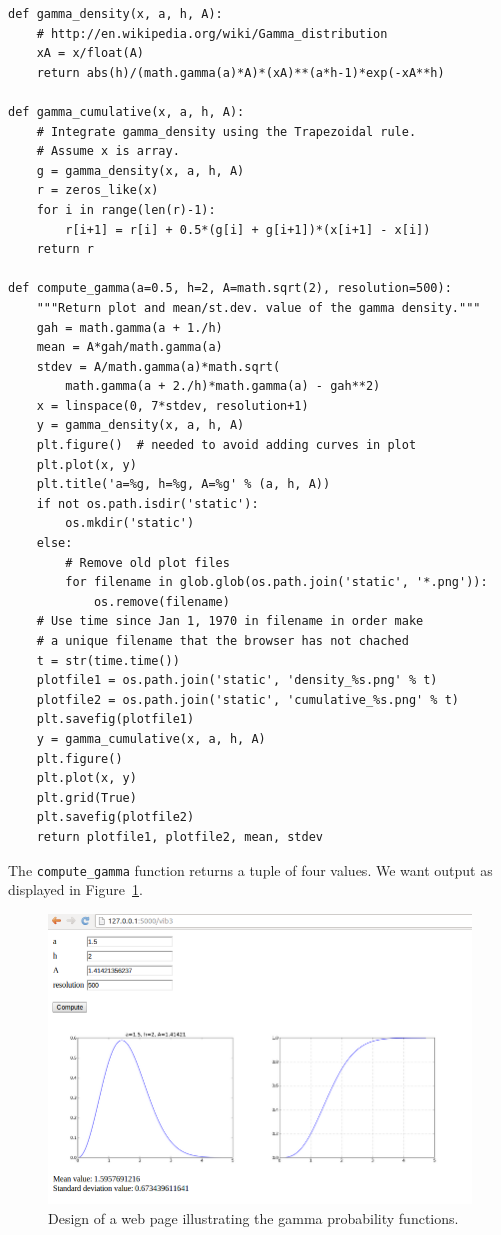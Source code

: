 \documentclass[%
oneside,                 %
final,                   %
10pt]{article}
\begin{document}
\begin{Verbatim}[numbers=none,fontsize=\fontsize{9pt}{9pt},baselinestretch=0.85]
def gamma_density(x, a, h, A):
    # http://en.wikipedia.org/wiki/Gamma_distribution
    xA = x/float(A)
    return abs(h)/(math.gamma(a)*A)*(xA)**(a*h-1)*exp(-xA**h)

def gamma_cumulative(x, a, h, A):
    # Integrate gamma_density using the Trapezoidal rule.
    # Assume x is array.
    g = gamma_density(x, a, h, A)
    r = zeros_like(x)
    for i in range(len(r)-1):
        r[i+1] = r[i] + 0.5*(g[i] + g[i+1])*(x[i+1] - x[i])
    return r

def compute_gamma(a=0.5, h=2, A=math.sqrt(2), resolution=500):
    """Return plot and mean/st.dev. value of the gamma density."""
    gah = math.gamma(a + 1./h)
    mean = A*gah/math.gamma(a)
    stdev = A/math.gamma(a)*math.sqrt(
        math.gamma(a + 2./h)*math.gamma(a) - gah**2)
    x = linspace(0, 7*stdev, resolution+1)
    y = gamma_density(x, a, h, A)
    plt.figure()  # needed to avoid adding curves in plot
    plt.plot(x, y)
    plt.title('a=%g, h=%g, A=%g' % (a, h, A))
    if not os.path.isdir('static'):
        os.mkdir('static')
    else:
        # Remove old plot files
        for filename in glob.glob(os.path.join('static', '*.png')):
            os.remove(filename)
    # Use time since Jan 1, 1970 in filename in order make
    # a unique filename that the browser has not chached
    t = str(time.time())
    plotfile1 = os.path.join('static', 'density_%s.png' % t)
    plotfile2 = os.path.join('static', 'cumulative_%s.png' % t)
    plt.savefig(plotfile1)
    y = gamma_cumulative(x, a, h, A)
    plt.figure()
    plt.plot(x, y)
    plt.grid(True)
    plt.savefig(plotfile2)
    return plotfile1, plotfile2, mean, stdev
\end{Verbatim}
The \Verb!compute_gamma! function returns a tuple of four values.
We want output as displayed in Figure~\ref{wf:vib3:flask:fig:gamma}.


\begin{figure}[ht]
  \centerline{\includegraphics[width=0.9\linewidth]{fig-web4sa/vib3_flask_gamma.png}}
  \caption{
  Design of a web page illustrating the gamma probability functions. \label{wf:vib3:flask:fig:gamma}
  }
\end{figure}
\end{document}
